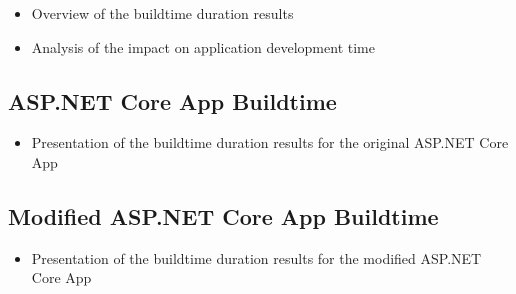 \begin{itemize}
    \item Overview of the buildtime duration results
    \item Analysis of the impact on application development time
\end{itemize}

\subsection{ASP.NET Core App Buildtime}

\begin{itemize}
    \item Presentation of the buildtime duration results for the original ASP.NET Core App
\end{itemize}

\subsection{Modified ASP.NET Core App Buildtime}

\begin{itemize}
    \item Presentation of the buildtime duration results for the modified ASP.NET Core App
\end{itemize}